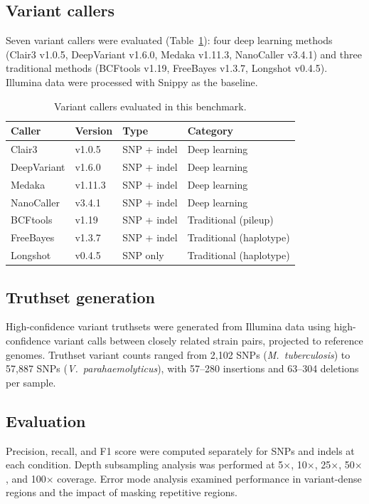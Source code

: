 \documentclass[11pt]{article}
\begin{document}
\subsection{Variant callers}
Seven variant callers were evaluated (Table~\ref{tab:callers}): four deep learning methods (Clair3 v1.0.5, DeepVariant v1.6.0, Medaka v1.11.3, NanoCaller v3.4.1) and three traditional methods (BCFtools v1.19, FreeBayes v1.3.7, Longshot v0.4.5). Illumina data were processed with Snippy as the baseline.

\begin{table}[htbp]
\centering
\caption{Variant callers evaluated in this benchmark.}
\label{tab:callers}
\begin{tabular}{@{}llll@{}}
\toprule
Caller & Version & Type & Category \\
\midrule
Clair3      & v1.0.5  & SNP + indel & Deep learning \\
DeepVariant & v1.6.0  & SNP + indel & Deep learning \\
Medaka      & v1.11.3 & SNP + indel & Deep learning \\
NanoCaller  & v3.4.1  & SNP + indel & Deep learning \\
BCFtools    & v1.19   & SNP + indel & Traditional (pileup) \\
FreeBayes   & v1.3.7  & SNP + indel & Traditional (haplotype) \\
Longshot    & v0.4.5  & SNP only    & Traditional (haplotype) \\
\bottomrule
\end{tabular}
\end{table}

\subsection{Truthset generation}
High-confidence variant truthsets were generated from Illumina data using high-confidence variant calls between closely related strain pairs, projected to reference genomes. Truthset variant counts ranged from 2,102 SNPs (\textit{M.\ tuberculosis}) to 57,887 SNPs (\textit{V.\ parahaemolyticus}), with 57--280 insertions and 63--304 deletions per sample.

\subsection{Evaluation}
Precision, recall, and F1 score were computed separately for SNPs and indels at each condition. Depth subsampling analysis was performed at 5$\times$, 10$\times$, 25$\times$, 50$\times$, and 100$\times$ coverage. Error mode analysis examined performance in variant-dense regions and the impact of masking repetitive regions.
\end{document}
